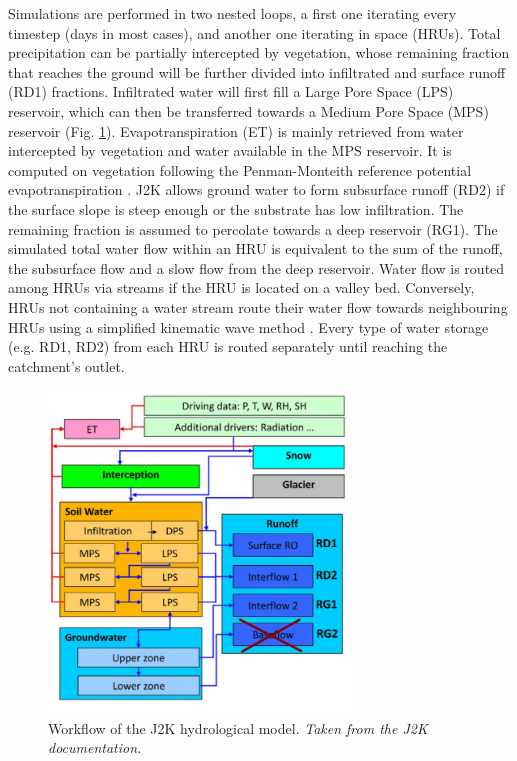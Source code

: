 Simulations are performed in two nested loops, a first one iterating every timestep (days in most cases), and another one iterating in space (HRUs). Total precipitation can be partially intercepted by vegetation, whose remaining fraction that reaches the ground will be further divided into infiltrated and surface runoff (RD1) fractions. Infiltrated water will first fill a Large Pore Space (LPS) reservoir, which can then be transferred towards a Medium Pore Space (MPS) reservoir (Fig. \ref{hydro:fig2}). Evapotranspiration (ET) is mainly retrieved from water intercepted by vegetation and water available in the MPS reservoir. It is computed on vegetation following the Penman-Monteith reference potential evapotranspiration \citep{howell_penman-monteith_2004}. J2K allows ground water to form subsurface runoff (RD2) if the surface slope is steep enough or the substrate has low infiltration. The remaining fraction is assumed to percolate towards a deep reservoir (RG1). The simulated total water flow within an HRU is equivalent to the sum of the runoff, the subsurface flow and a slow flow from the deep reservoir. Water flow is routed among HRUs via streams if the HRU is located on a valley bed. Conversely, HRUs not containing a water stream route their water flow towards neighbouring HRUs using a simplified kinematic wave method \citep{chen_surface_1970}. Every type of water storage (e.g. RD1, RD2) from each HRU is routed separately until reaching the catchment's outlet. 

\begin{figure}[h]
\centering
\includegraphics[width=8cm]{Figures/hydro/Figure_1.png}
\caption{Workflow of the J2K hydrological model. \textit{Taken from the J2K documentation.}} 
\label{hydro:fig2}
\end{figure}

